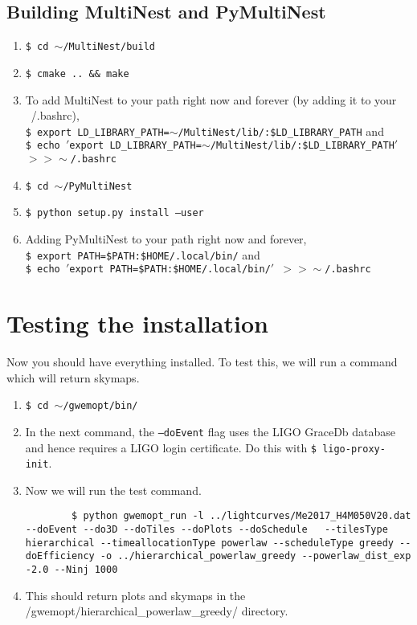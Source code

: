 \documentclass[11pt]{article}
\begin{document}
\subsection{Building MultiNest and PyMultiNest}
\begin{enumerate}
	\item {\tt \$ cd $\sim$/MultiNest/build}
	\item {\tt \$ cmake .. \&\& make}
	\item To add MultiNest to your path right now and forever (by adding it to your ~/.bashrc), \\{\tt \$ export LD\_LIBRARY\_PATH=$\sim$/MultiNest/lib/:\$LD\_LIBRARY\_PATH} and \\{\tt \$ echo $'$export LD\_LIBRARY\_PATH=$\sim$/MultiNest/lib/:\$LD\_LIBRARY\_PATH$'$ $>>\sim$/.bashrc}
	\item {\tt \$ cd $\sim$/PyMultiNest}
	\item {\tt \$ python setup.py install --user}
	\item Adding PyMultiNest to your path right now and forever,\\{\tt \$ export PATH=\$PATH:\$HOME/.local/bin/} and \\{\tt \$ echo $'$export PATH=\$PATH:\$HOME/.local/bin/$'$ $>>\sim$/.bashrc}
\end{enumerate}

\section{Testing the installation}
Now you should have everything installed. To test this, we will run a command which will return skymaps.
\begin{enumerate}
	\item {\tt \$ cd $\sim$/gwemopt/bin/}
	\item In the next command, the {\tt --doEvent} flag uses the LIGO GraceDb database and hence requires a LIGO login certificate. Do this with {\tt \$ ligo-proxy-init}.
	\item Now we will run the test command.
	\begin{lstlisting}
		$ python gwemopt_run -l ../lightcurves/Me2017_H4M050V20.dat --doEvent --do3D --doTiles --doPlots --doSchedule 	--tilesType hierarchical --timeallocationType powerlaw --scheduleType greedy --doEfficiency -o ../hierarchical_powerlaw_greedy --powerlaw_dist_exp -2.0 --Ninj 1000	
	\end{lstlisting}
	\item This should return plots and skymaps in the /gwemopt/hierarchical\_powerlaw\_greedy/ directory.

\end{enumerate}
\end{document}
